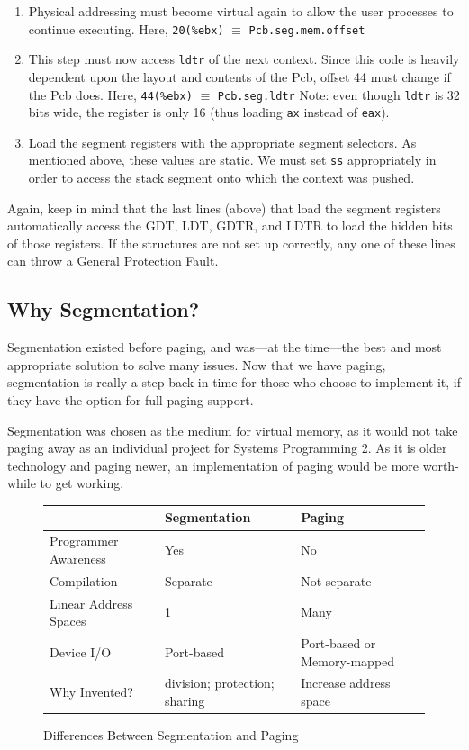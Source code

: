 \documentclass[titlepage]{article}
\begin{document}
\begin{enumerate}
    \item Physical addressing must become virtual again to allow the user
    processes to continue executing. Here, \verb|20(%ebx)| $\equiv$
    \verb|Pcb.seg.mem.offset|
    \item This step must now access \verb|ldtr| of the next context. Since this
    code is heavily dependent upon the layout and contents of the Pcb, offset 44
    must change if the Pcb does. Here, \verb|44(%ebx)| $\equiv$
    \verb|Pcb.seg.ldtr| Note: even though \verb|ldtr| is 32 bits wide, the
    register is only 16 (thus loading \verb|ax| instead of \verb|eax|).
    \item Load the segment registers with the appropriate segment selectors. As
    mentioned above, these values are static. We must set \verb|ss|
    appropriately in order to access the stack segment onto which the context
    was pushed.
\end{enumerate}

Again, keep in mind that the last lines (above) that load the segment registers
automatically access the GDT, LDT, GDTR, and LDTR to load the hidden bits of
those registers.  If the structures are not set up correctly, any one of these
lines can throw a General Protection Fault.

\subsection{Why Segmentation?} Segmentation existed before paging, and
was---at the time---the best and most appropriate solution to solve many issues.
Now that we have paging, segmentation is really a step back in time for those
who choose to implement it, if they have the option for full paging support.

Segmentation was chosen as the medium for virtual memory, as it would not take
paging away as an individual project for Systems Programming 2. As it is older
technology and paging newer, an implementation of paging would be more
worth-while to get working.

\begin{figure}
\begin{tabular}[c]{l l l}
                        &   Segmentation    & Paging    \\
\hline
Programmer Awareness    & Yes       & No                \\
Compilation             & Separate  & Not separate      \\
Linear Address Spaces   & 1         & Many              \\
Device I/O              & Port-based& Port-based or Memory-mapped \\
Why Invented?           & division; protection; sharing & Increase address space \\
\end{tabular}
\caption{Differences Between Segmentation and Paging}
\end{figure}
\end{document}
